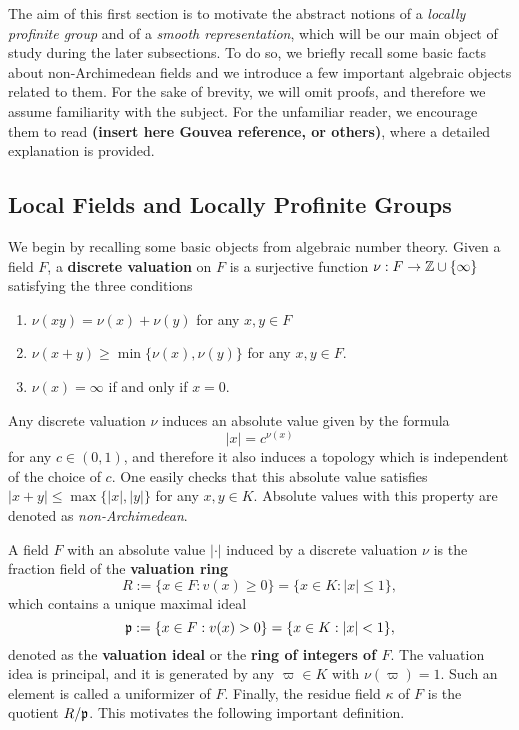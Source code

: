 The aim of this first section is to motivate the abstract notions of a \textit{locally profinite group} and of a \textit{smooth representation}, which will be our main object of study during the later subsections. To do so, we briefly recall some basic facts about non-Archimedean fields and we introduce a few important algebraic objects related to them. For the sake of brevity, we will omit proofs, and therefore we assume familiarity with the subject. For the unfamiliar reader, we encourage them to read \textbf{(insert here Gouvea reference, or others)}, where a detailed explanation is provided. 


\subsection{Local Fields and Locally Profinite Groups}
We begin by recalling some basic objects from algebraic number theory. Given a field $F$, a \textbf{discrete valuation} on $F$ is a surjective function $\nu: F\to\mathbb{Z}\cup\{\infty\}$ satisfying the three conditions

\begin{enumerate}
    \item $\nu(xy)=\nu(x)+\nu(y)$ for any $x,y\in F$ 
    \item $\nu(x+y)\geq\min\{\nu(x),\nu(y)\}$ for any $x,y\in F$.
    \item $\nu(x)=\infty$ if and only if $x=0$.
\end{enumerate}

Any discrete valuation $\nu$ induces an absolute value given by the formula 
$$|x|=c^{\nu(x)}$$ 
for any $c\in(0,1)$, and therefore it also induces a topology which is independent of the choice of $c$. One easily checks that this absolute value satisfies $|x+y|\leq\max\{|x|,|y|\}$ for any $x,y\in K$. Absolute values with this property are denoted as \textit{non-Archimedean}. 

A field $F$ with an absolute value $|\cdot|$ induced by a discrete valuation $\nu$ is the fraction field of the \textbf{valuation ring}
$$R:=\{x\in F:v(x)\geq 0\}=\{x\in K: |x|\leq1\},$$ 
which contains a unique maximal ideal
$$\mathfrak{p}:=\{x\in F:v(x)> 0\}=\{x\in K: |x|<1\},$$
denoted as the \textbf{valuation ideal} or the \textbf{ring of integers of $F$}. The valuation idea is principal, and it is generated by any $\varpi\in K$ with $\nu(\varpi)=1$. Such an element is called a uniformizer of $F$. Finally, the residue field $\kappa$ of $F$ is the quotient $R/\mathfrak{p}$. This motivates the following important definition.

